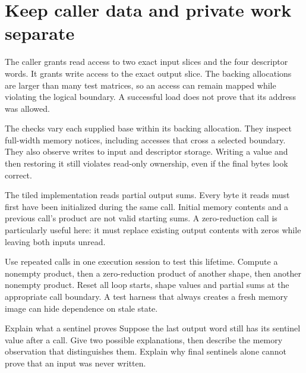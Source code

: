 \section{Keep caller data and private work separate}
The caller grants read access to two exact input slices and the four descriptor
words. It grants write access to the exact output slice. The backing allocations
are larger than many test matrices, so an access can remain mapped while violating
the logical boundary. A successful load does not prove that its address was allowed.

The checks vary each supplied base within its backing allocation. They inspect
full-width memory notices, including accesses that cross a selected boundary.
They also observe writes to input and descriptor storage. Writing a value and then
restoring it still violates read-only ownership, even if the final bytes look correct.

The tiled implementation reads partial output sums. Every byte it reads must first
have been initialized during the same call. Initial memory contents and a previous
call's product are not valid starting sums. A zero-reduction call is particularly
useful here: it must replace existing output contents with zeros while leaving both
inputs unread.

Use repeated calls in one execution session to test this lifetime. Compute a
nonempty product, then a zero-reduction product of another shape, then another
nonempty product. Reset all loop starts, shape values and partial sums at the
appropriate call boundary. A test harness that always creates a fresh memory image
can hide dependence on stale state.

\begin{MARSExercise}{Explain what a sentinel proves}
  Suppose the last output word still has its sentinel value after a call. Give two
  possible explanations, then describe the memory observation that distinguishes
  them. Explain why final sentinels alone cannot prove that an input was never written.
\end{MARSExercise}
